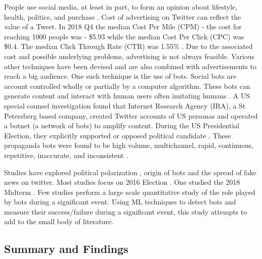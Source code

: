 \documentclass[letterpaper]{article}
\begin{document}
People use social media, at least in part, to form an opinion about lifestyle, health, politics, and purchase \cite{varol2017early}. Cost of advertising on Twitter 
can reflect the value of a Tweet. In 2018 Q4 the median Cost Per Mile (CPM) - the cost for reaching 1000 people
was - \$5.93 while the median Cost Per Click (CPC) was \$0.4. The median Click Through Rate (CTR) was 1.55\% \cite{adstage_2018_report}. 
Due to the associated cost and possible underlying problems, advertising is not always feasible. 
Various other techniques have been devised and are also combined with advertisements to reach a big audience. One such technique is the use of bots. 
Social bots are account controlled wholly or partially by a computer algorithm. 
These bots can generate content and interact with human users often imitating humans \cite{ferrara2016rise}.
 A US special counsel investigation found that Internet Research Agency (IRA), a St Petersberg based company,
created Twitter accounts of US personas and operated a botnet (a network of bots) to amplify content. 
During the US Presidential Election, they explicitly supported or opposed political candidate \cite{luceri2019red,mueller_investigation}. 
These propaganda bots were found to be high volume, multichannel, rapid, continuous, repetitive, inaccurate, and inconsistent \cite{paul2016russian}. \par

Studies have explored political polarization \cite{munger2017don,rizoiu2018debatenight,gruzd2014investigating,bovet2019influence} , origin of bots 
\cite{zannettou2019let,zannettou2019characterizing} and the spread of fake news \cite{vosoughi2018spread,shao2018spread,lazer2018science,bovet2019influence,grinberg2019fake}
on twitter. Most studies focus on 2016 Election \cite{bovet2019influence,rizoiu2018debatenight,bessi2016social,howard2018algorithms,howard2016bots}. One studied the 2018 Midterm 
\cite{deb2019perils}. Few studies perform a large scale quantitative study of the role played by bots during a significant event. Using ML techniques to detect bots and measure their success/failure during a significant event, 
this study attempts to add to the small body of literature. \par

\subsection{Summary and Findings}
\end{document}
